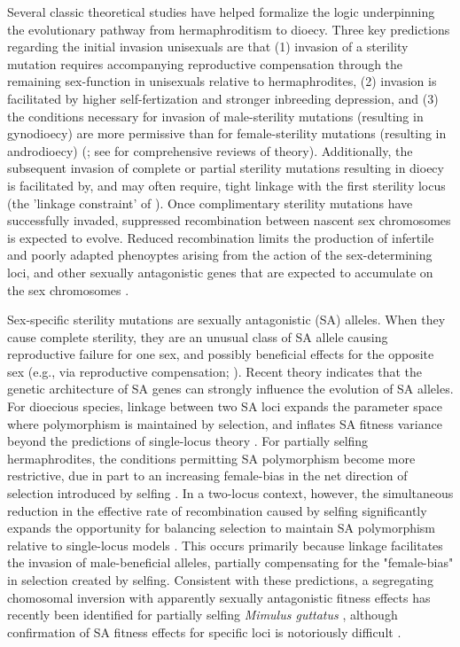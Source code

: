 \documentclass[9pt,twocolumn,twoside,lineno]{gsajnl}
\begin{document}
Several classic theoretical studies have helped formalize the logic underpinning the evolutionary pathway from hermaphroditism to dioecy. Three key predictions regarding the initial invasion unisexuals are that (1) invasion of a sterility mutation requires accompanying reproductive compensation through the remaining sex-function in unisexuals relative to hermaphrodites, (2) invasion is facilitated by higher self-fertization and stronger inbreeding depression, and (3) the conditions necessary for invasion of male-sterility mutations (resulting in gynodioecy) are more permissive than for female-sterility mutations (resulting in androdioecy) (\citealt{Lewis1941,Lloyd1975,Lloyd1976,Charlesworth1978a}; see \citealt{Charlesworth1999,Charlesworth2006} for comprehensive reviews of theory). Additionally, the subsequent invasion of complete or partial sterility mutations resulting in dioecy is facilitated by, and may often require, tight linkage with the first sterility locus (the 'linkage constraint' of \citealt{Charlesworth1978a}). Once complimentary sterility mutations have successfully invaded, suppressed recombination between nascent sex chromosomes is expected to evolve. Reduced recombination limits the production of infertile and poorly adapted phenoyptes arising from the action of the sex-determining loci, and other sexually antagonistic genes that are expected to accumulate on the sex chromosomes \citep{Charlesworth2002,Bachtrog2006}. 

Sex-specific sterility mutations are sexually antagonistic (SA) alleles. When they cause complete sterility, they are an unusual class of SA allele causing reproductive failure for one sex, and possibly beneficial effects for the opposite sex (e.g., via reproductive compensation; \citealt{Lewis1941,Lloyd1975,Charlesworth1978a}). Recent theory indicates that the genetic architecture of SA genes can strongly influence the evolution of SA alleles. For dioecious species, linkage between two SA loci expands the parameter space where polymorphism is maintained by selection, and inflates SA fitness variance beyond the predictions of single-locus theory \citep{Kidwell1977,Patten2010,UbedaPatten2010}. For partially selfing hermaphrodites, the conditions permitting SA polymorphism become more restrictive, due in part to an increasing female-bias in the net direction of selection introduced by selfing \citep{JordanConnallon2014}. In a two-locus context, however, the simultaneous reduction in the effective rate of recombination caused by selfing significantly expands the opportunity for balancing selection to maintain SA polymorphism relative to single-locus models \citep{Olito2017}. This occurs primarily because linkage facilitates the invasion of male-beneficial alleles, partially compensating for the "female-bias" in selection created by selfing. Consistent with these predictions, a segregating chomosomal inversion with apparently sexually antagonistic fitness effects has recently been identified for partially selfing \textit{Mimulus guttatus} \citep{LeeKelly2015}, although confirmation of SA fitness effects for specific loci is notoriously difficult \citep{ConnallonClark2012,Barson2015}.
\end{document}
